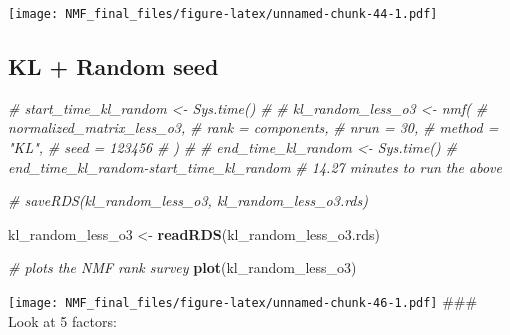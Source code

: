 \documentclass[
]{article}
\newenvironment{Shaded}{\begin{snugshade}}{\end{snugshade}}
\newcommand{\AttributeTok}[1]{\textcolor[rgb]{0.13,0.29,0.53}{#1}}
\newcommand{\CommentTok}[1]{\textcolor[rgb]{0.56,0.35,0.01}{\textit{#1}}}
\newcommand{\FunctionTok}[1]{\textcolor[rgb]{0.13,0.29,0.53}{\textbf{#1}}}
\newcommand{\NormalTok}[1]{#1}
\newcommand{\OtherTok}[1]{\textcolor[rgb]{0.56,0.35,0.01}{#1}}
\newcommand{\SpecialCharTok}[1]{\textcolor[rgb]{0.81,0.36,0.00}{\textbf{#1}}}
\newcommand{\StringTok}[1]{\textcolor[rgb]{0.31,0.60,0.02}{#1}}
\begin{document}
\texttt{[image: NMF\_final\_files/figure-latex/unnamed-chunk-44-1.pdf]}

\subsection{KL + Random seed}\label{kl-random-seed}

\begin{Shaded}
\begin{Highlighting}[]
\CommentTok{\# start\_time\_kl\_random \textless{}{-} Sys.time()}
\CommentTok{\# }
\CommentTok{\# kl\_random\_less\_o3 \textless{}{-} nmf(}
\CommentTok{\#   normalized\_matrix\_less\_o3,}
\CommentTok{\#   rank = components,}
\CommentTok{\#   nrun = 30,}
\CommentTok{\#   method = "KL",}
\CommentTok{\#   seed = 123456}
\CommentTok{\# )}
\CommentTok{\# }
\CommentTok{\# end\_time\_kl\_random \textless{}{-} Sys.time()}
\CommentTok{\# end\_time\_kl\_random{-}start\_time\_kl\_random}
\CommentTok{\# 14.27 minutes to run the above}

\CommentTok{\# saveRDS(kl\_random\_less\_o3, \textquotesingle{}kl\_random\_less\_o3.rds\textquotesingle{})}

\NormalTok{kl\_random\_less\_o3 }\OtherTok{\textless{}{-}} \FunctionTok{readRDS}\NormalTok{(}\StringTok{\textquotesingle{}kl\_random\_less\_o3.rds\textquotesingle{}}\NormalTok{)}
\end{Highlighting}
\end{Shaded}

\begin{Shaded}
\begin{Highlighting}[]
\CommentTok{\# plots the NMF rank survey}
\FunctionTok{plot}\NormalTok{(kl\_random\_less\_o3)}
\end{Highlighting}
\end{Shaded}

\texttt{[image: NMF\_final\_files/figure-latex/unnamed-chunk-46-1.pdf]}
\#\#\# Look at 5 factors:

\begin{Shaded}
\end{Shaded}
\end{document}
